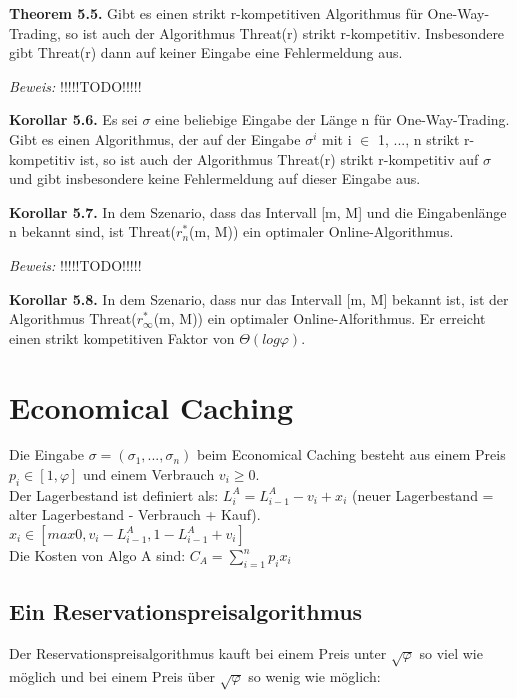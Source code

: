 \textbf{Theorem 5.5.} Gibt es einen strikt r-kompetitiven Algorithmus für One-Way-Trading, so ist auch der Algorithmus Threat(r) strikt r-kompetitiv. Insbesondere gibt Threat(r) dann auf keiner Eingabe eine Fehlermeldung aus.

\textit{Beweis:} !!!!!TODO!!!!!

\textbf{Korollar 5.6.} Es sei $\sigma$ eine beliebige Eingabe der Länge n für One-Way-Trading. Gibt es einen Algorithmus, der auf der Eingabe $\sigma^{i}$ mit i $\in$ {1, ..., n} strikt r-kompetitiv ist, so ist auch der Algorithmus Threat(r) strikt r-kompetitiv auf $\sigma$ und gibt insbesondere keine Fehlermeldung auf dieser Eingabe aus.

\textbf{Korollar 5.7.} In dem Szenario, dass das Intervall [m, M] und die Eingabenlänge n bekannt sind, ist Threat($r_{n}^{*}$(m, M)) ein optimaler Online-Algorithmus.

\textit{Beweis:} !!!!!TODO!!!!!

\textbf{Korollar 5.8.} In dem Szenario, dass nur das Intervall [m, M] bekannt ist, ist der Algorithmus Threat($r_{\infty}^{*}$(m, M)) ein optimaler Online-Alforithmus. Er erreicht einen strikt kompetitiven Faktor von $\Theta(log \varphi)$. 

\section{Economical Caching}

Die Eingabe $\sigma = (\sigma_{1}, ..., \sigma_{n})$ beim Economical Caching besteht aus einem Preis $p_{i} \in [1, \varphi]$ und einem Verbrauch $v_{i} \ge 0$.\\
Der Lagerbestand ist definiert als: $L_{i}^{A} = L_{i-1}^{A} - v_{i} + x_{i}$ (neuer Lagerbestand = alter Lagerbestand - Verbrauch + Kauf).\\
$x_{i} \in [max{0, v_{i}-L_{i-1}^{A}}, 1-L_{i-1}^{A}+v_{i}]$ \\
Die Kosten von Algo A sind: $C_{A} = \sum_{i = 1}^{n} p_{i}x_{i}$

\subsection{Ein Reservationspreisalgorithmus}

Der Reservationspreisalgorithmus kauft bei einem Preis unter $\sqrt{\varphi}$ so viel wie möglich und bei einem Preis über $\sqrt{\varphi}$ so wenig wie möglich: \\


